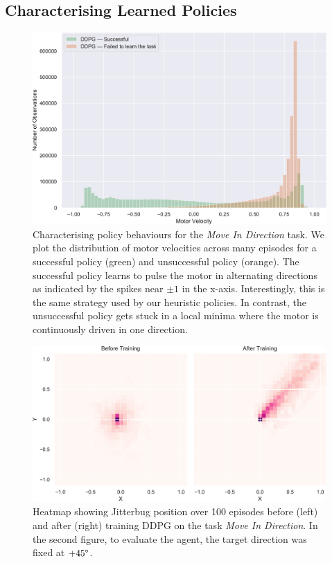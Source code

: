 \documentclass[letterpaper, 10 pt, conference]{ieeeconf}
\begin{document}
\subsection{Characterising Learned Policies}

\begin{figure}[t]
    \centering
    \includegraphics[width=\linewidth]{fig-motor-hist}
    \caption{
        Characterising policy behaviours for the \emph{Move In Direction} task.
        We plot the distribution of motor velocities across many episodes for a successful policy (green) and unsuccessful policy (orange).
        The successful policy learns to pulse the motor in alternating directions as indicated by the spikes near $\pm 1$ in the x-axis.
        Interestingly, this is the same strategy used by our heuristic policies.
        In contrast, the unsuccessful policy gets stuck in a local minima where the motor is continuously driven in one direction.
    }
    \label{fig:motor-hist}
\end{figure}

\begin{figure}[t]
    \centering
    \includegraphics[width=\linewidth]{fig-heatmap}
    \caption{
        Heatmap showing Jitterbug position over 100 episodes before (left) and after (right) training DDPG on the task \emph{Move In Direction}.
        In the second figure, to evaluate the agent, the target direction was fixed at $+45\degree$.
    }
    \label{fig:heatmap}
\end{figure}
\end{document}
